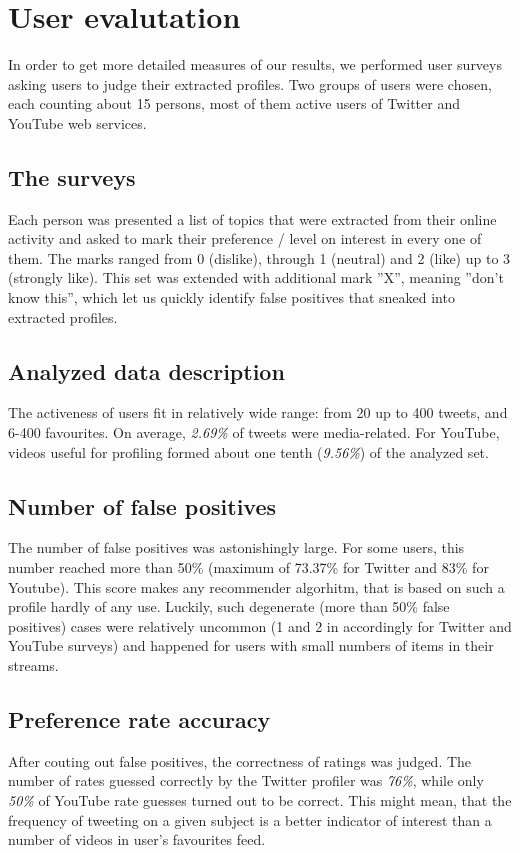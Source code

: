 \section{User evalutation}
In order to get more detailed measures of our results, we performed user surveys
asking users to judge their extracted profiles. Two groups of users were chosen,
each counting about 15 persons, most of them active users of Twitter and YouTube
web services.

\subsection{The surveys}

Each person was presented a list of topics that were extracted from their online
activity and asked to mark their preference / level on interest in every one of
them. The marks ranged from 0 (dislike), through 1 (neutral) and 2 (like) up to
3 (strongly like). This set was extended with additional mark ''X'', meaning
''don't know this'', which let us quickly identify false positives that sneaked
into extracted profiles.

\subsection{Analyzed data description}
The activeness of users fit in relatively wide range: from 20 up to 400 tweets,
and 6-400 favourites. On average, \textit{2.69\%} of tweets were media-related.
For YouTube, videos useful for profiling formed about one tenth (\textit{9.56\%})
of the analyzed set.

\subsection{Number of false positives}
The number of false positives was astonishingly large. For some users, this
number reached more than 50\% (maximum of 73.37\% for Twitter and 83\% for
Youtube). This score makes any
recommender algorhitm, that is based on such a profile hardly of any use.
Luckily, such degenerate (more than 50\% false positives) cases were relatively
uncommon (1 and 2 in accordingly for Twitter and YouTube surveys) and happened
for users with small numbers of items in their streams.

\subsection{Preference rate accuracy}
After couting out false positives, the correctness of ratings was judged. The
number of rates guessed correctly by the Twitter profiler was \textit{76\%},
while only \textit{50\%} of YouTube rate guesses turned out to be correct. This
might mean, that the frequency of tweeting on a given subject is a better
indicator of interest than a number of videos in user's favourites feed.
